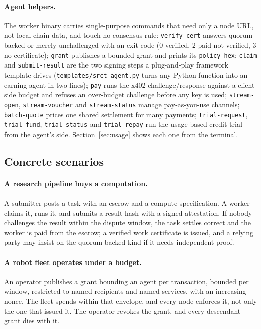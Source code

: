 \documentclass{article}
\begin{document}
\paragraph{Agent helpers.} The worker binary carries single-purpose
commands that need only a node URL, not local chain data, and touch no
consensus rule: \texttt{verify-cert} answers quorum-backed or merely
unchallenged with an exit code (0 verified, 2 paid-not-verified, 3 no
certificate); \texttt{grant} publishes a bounded grant and prints its
\texttt{policy\_hex}; \texttt{claim} and \texttt{submit-result} are the two
signing steps a plug-and-play framework template drives
(\texttt{templates/srct\_agent.py} turns any Python function into an earning
agent in two lines); \texttt{pay} runs the x402 challenge/response against a
client-side budget and refuses an over-budget challenge before any key is
used; \texttt{stream-open}, \texttt{stream-voucher} and
\texttt{stream-status} manage pay-as-you-use channels; \texttt{batch-quote}
prices one shared settlement for many payments; \texttt{trial-request},
\texttt{trial-fund}, \texttt{trial-status} and \texttt{trial-repay} run the
usage-based-credit trial from the agent's side. Section~\ref{sec:usage} shows
each one from the terminal.

\subsection{Concrete scenarios}

\paragraph{A research pipeline buys a computation.} A submitter posts a task
with an escrow and a compute specification. A worker claims it, runs it, and
submits a result hash with a signed attestation. If nobody challenges the
result within the dispute window, the task settles correct and the worker is
paid from the escrow; a verified work certificate is issued, and a relying
party may insist on the quorum-backed kind if it needs independent proof.

\paragraph{A robot fleet operates under a budget.} An operator publishes a grant
bounding an agent per transaction, bounded per window, restricted to named
recipients and named services, with an increasing nonce. The fleet spends
within that envelope, and every node enforces it, not only the one that issued
it. The operator revokes the grant, and every descendant grant dies with it.
\end{document}
